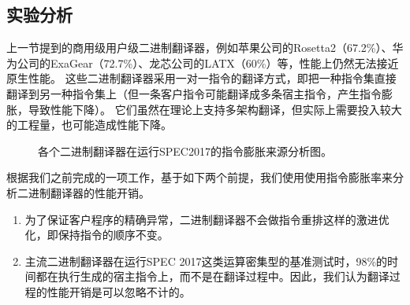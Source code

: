 \subsection{实验分析}

上一节提到的商用级用户级二进制翻译器，例如苹果公司的Rosetta2（67.2\%）、华为公司的ExaGear（72.7\%）、龙芯公司的LATX（60\%）等，性能上仍然无法接近原生性能。
这些二进制翻译器采用一对一指令的翻译方式，即把一种指令集直接翻译到另一种指令集上（但一条客户指令可能翻译成多条宿主指令，产生指令膨胀，导致性能下降）。
它们虽然在理论上支持多架构翻译，但实际上需要投入较大的工程量，也可能造成性能下降。


\begin{figure}[!htbp]
  \centering
  \caption{各个二进制翻译器在运行SPEC2017的指令膨胀来源分析图。}
  \label{img:insts_inflt_breakdown_2017}
\end{figure}

根据我们之前完成的一项工作\cite{deflater}，基于如下两个前提，我们使用使用指令膨胀率来分析二进制翻译器的性能开销。
\begin{enumerate}
\item  为了保证客户程序的精确异常，二进制翻译器不会做指令重排这样的激进优化，即保持指令的顺序不变。

\item  主流二进制翻译器在运行SPEC 2017这类运算密集型的基准测试时，98\%的时间都在执行生成的宿主指令上，而不是在翻译过程中。因此，我们认为翻译过程的性能开销是可以忽略不计的。

\end{enumerate}

